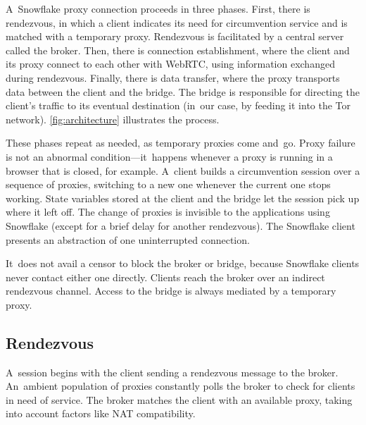 \documentclass[letterpaper,twocolumn]{article}
\begin{document}
A~Snowflake proxy connection proceeds in three phases.
First, there is rendezvous, in which a client
indicates its need for circumvention service
and is matched with a temporary proxy.
Rendezvous is facilitated by a central server called the broker.
Then, there is connection establishment,
where the client and its proxy connect to each other
with WebRTC, using information exchanged during rendezvous.
Finally, there is data transfer,
where the proxy transports data
between the client and the bridge.
The bridge is responsible for directing the client's traffic
to its eventual destination
(in~our case, by feeding it into the Tor network).
\autoref{fig:architecture} illustrates the process.

These phases repeat as needed, as temporary proxies come and~go.
Proxy failure is not an abnormal condition---it~happens whenever
a proxy is running in a browser that is closed, for example.
A~client builds a circumvention session over
a sequence of proxies, switching to a new one
whenever the current one stops working.
State variables stored at the client and the bridge
let the session pick up where it left off.
The change of proxies is invisible to the applications using Snowflake
(except for a brief delay for another rendezvous).
The Snowflake client presents an abstraction of one uninterrupted connection.

It~does not avail a censor to block the broker or bridge,
because Snowflake clients never contact either one directly.
Clients reach the broker over an indirect rendezvous channel.
Access to the bridge is always mediated by a temporary proxy.

\subsection{Rendezvous}
\label{sec:rendezvous}

A~session begins with the client sending a rendezvous message to the broker.
An~ambient population of proxies
constantly polls the broker to check for clients in need of service.
The broker matches the client with an available proxy,
taking into account factors like NAT compatibility.
\end{document}
